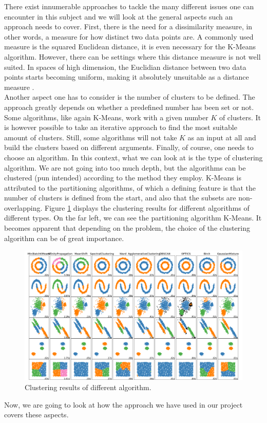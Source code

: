 \documentclass[]{report}
\begin{document}
There exist innumerable approaches to tackle the many different issues one can encounter in this subject and we will look at the general aspects such an approach needs to cover. First, there is the need for a dissimilarity measure, in other words, a measure for how distinct two data points are. A commonly used measure is the squared Euclidean distance, it is even necessary for the K-Means algorithm. However, there can be settings where this distance measure is not well suited. In spaces of high dimension, the Euclidian distance between two data points starts becoming uniform, making it absolutely unsuitable as a distance measure \cite{distmetricsbehavior}.\\
Another aspect one has to consider is the number of clusters to be defined. The approach greatly depends on whether a predefined number has been set or not. Some algorithms, like again K-Means, work with a given number $K$ of clusters. It is however possible to take an iterative approach to find the most suitable amount of clusters. Still, some algorithms will not take $K$ as an input at all and build the clusters based on different arguments.
Finally, of course, one needs to choose an algorithm. In this context, what we can look at is the type of clustering algorithm. We are not going into too much depth, but the algorithms can be clustered (pun intended) according to the method they employ. K-Means is attributed to the partitioning algorithms, of which a defining feature is that the number of clusters is defined from the start, and also that the subsets are non-overlapping. Figure \ref{fig:clustermethodcomparison} displays the clustering results for different algorithms of different types. On the far left, we can see the partitioning algorithm K-Means. It becomes apparent that depending on the problem, the choice of the clustering algorithm can be of great importance.  \\
\begin{figure}[h]
	\centering
	\includegraphics[width=0.7\linewidth]{Images/cluster_method_comparison}
	\caption[Clustering methods]{Clustering results of different algorithm.}
	\label{fig:clustermethodcomparison}
\end{figure}

Now, we are going to look at how the approach we have used in our project covers these aspects.


\printbibliography[title={References}]
\end{document}
